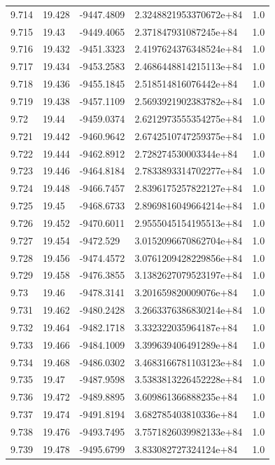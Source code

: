 \begin{tabular}{lllll}
9.714 & 19.428 & -9447.4809 & 2.3248821953370672e+84 & 1.0 \\
9.715 & 19.43 & -9449.4065 & 2.371847931087245e+84 & 1.0 \\
9.716 & 19.432 & -9451.3323 & 2.4197624376348524e+84 & 1.0 \\
9.717 & 19.434 & -9453.2583 & 2.4686448814215113e+84 & 1.0 \\
9.718 & 19.436 & -9455.1845 & 2.518514816076442e+84 & 1.0 \\
9.719 & 19.438 & -9457.1109 & 2.5693921902383782e+84 & 1.0 \\
9.72 & 19.44 & -9459.0374 & 2.6212973555354275e+84 & 1.0 \\
9.721 & 19.442 & -9460.9642 & 2.6742510747259375e+84 & 1.0 \\
9.722 & 19.444 & -9462.8912 & 2.728274530003344e+84 & 1.0 \\
9.723 & 19.446 & -9464.8184 & 2.7833893314702277e+84 & 1.0 \\
9.724 & 19.448 & -9466.7457 & 2.8396175257822127e+84 & 1.0 \\
9.725 & 19.45 & -9468.6733 & 2.8969816049664214e+84 & 1.0 \\
9.726 & 19.452 & -9470.6011 & 2.9555045154195513e+84 & 1.0 \\
9.727 & 19.454 & -9472.529 & 3.0152096670862704e+84 & 1.0 \\
9.728 & 19.456 & -9474.4572 & 3.0761209428229856e+84 & 1.0 \\
9.729 & 19.458 & -9476.3855 & 3.1382627079523197e+84 & 1.0 \\
9.73 & 19.46 & -9478.3141 & 3.201659820009076e+84 & 1.0 \\
9.731 & 19.462 & -9480.2428 & 3.2663376386830214e+84 & 1.0 \\
9.732 & 19.464 & -9482.1718 & 3.332322035964187e+84 & 1.0 \\
9.733 & 19.466 & -9484.1009 & 3.399639406491289e+84 & 1.0 \\
9.734 & 19.468 & -9486.0302 & 3.4683166781103123e+84 & 1.0 \\
9.735 & 19.47 & -9487.9598 & 3.5383813226452228e+84 & 1.0 \\
9.736 & 19.472 & -9489.8895 & 3.609861366888235e+84 & 1.0 \\
9.737 & 19.474 & -9491.8194 & 3.682785403810336e+84 & 1.0 \\
9.738 & 19.476 & -9493.7495 & 3.7571826039982133e+84 & 1.0 \\
9.739 & 19.478 & -9495.6799 & 3.833082727324124e+84 & 1.0 \\

\end{tabular}
